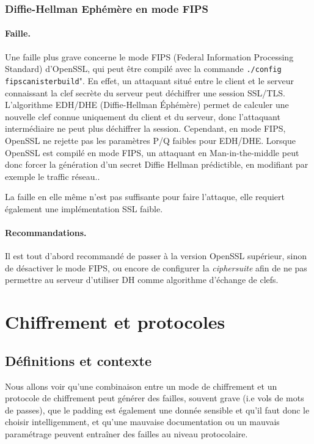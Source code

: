 \subsubsection{Diffie-Hellman Ephémère en mode FIPS}
\paragraph{Faille.\\}
Une faille plus grave concerne le mode FIPS (Federal Information Processing Standard) d'OpenSSL, qui peut être compilé avec la commande \texttt{./config fipscanisterbuild}". En effet, un attaquant situé entre le client et le serveur connaissant la clef secrète du serveur peut déchiffrer une session SSL/TLS. \\
	
		L'algorithme EDH/DHE (Diffie-Hellman Éphémère) permet de calculer une nouvelle clef connue uniquement du client et du serveur, donc l'attaquant intermédiaire ne peut plus déchiffrer la session. Cependant, en mode FIPS, OpenSSL ne rejette pas les paramètres P/Q faibles pour EDH/DHE. Lorsque OpenSSL est compilé en mode FIPS, un attaquant en Man-in-the-middle peut donc forcer la génération d'un secret Diffie Hellman prédictible, en modifiant par exemple le traffic réseau..

		La faille en elle même n'est pas suffisante pour faire l'attaque, elle requiert également une implémentation SSL faible. \\
		
\paragraph{Recommandations.\\}
		Il est tout d'abord recommandé de passer à la version OpenSSL supérieur, sinon de désactiver le mode FIPS, ou encore de configurer la \textit{ciphersuite} afin de ne pas permettre au serveur d'utiliser DH comme algorithme d'échange de clefs.


\section{Chiffrement et protocoles}

\subsection{Définitions et contexte}

Nous allons voir qu'une combinaison entre un mode de chiffrement et un protocole de chiffrement peut générer des failles, souvent grave (i.e vols de mots de passes), que le padding est également une donnée sensible et qu'il faut donc le choisir intelligemment, et qu'une mauvaise documentation ou un mauvais paramétrage peuvent entraîner des failles au niveau protocolaire.

